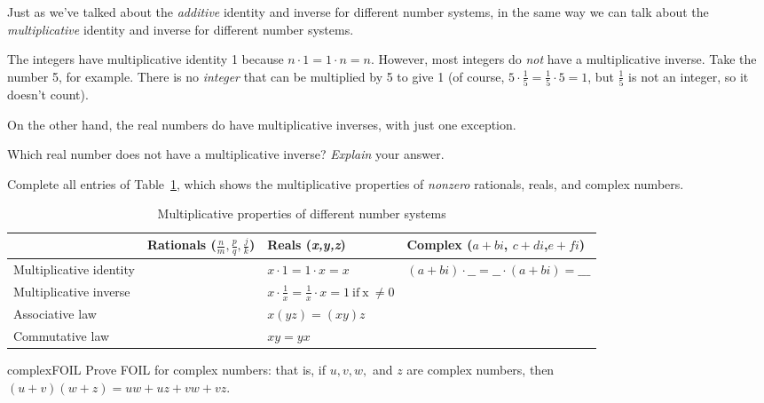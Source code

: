 Just as we've talked about the \emph{additive} identity and inverse
for different number systems, in the same way we can talk about the
\emph{multiplicative} identity and inverse for different number systems.

The integers have multiplicative identity 1 because $n\cdot1=1\cdot n=n$.
However, most integers do \emph{not} have a multiplicative inverse.
Take the number 5, for example. There is no \emph{integer} that can be multiplied by 5 to give 1 (of course, $5\cdot\frac{1}{5}=\frac{1}{5}\cdot5=1$,
but $\frac{1}{5}$ is not an integer, so it doesn't
count).

On the other hand, the real numbers do have multiplicative inverses,
with just one exception.

\begin{exercise}{14}
 Which real number does not
have a multiplicative inverse? \emph{Explain} your answer.
\end{exercise}

\begin{exercise}{15}
Complete all entries of Table~\ref{multiplicative_table}, which shows the multiplicative properties
of \emph{nonzero} rationals, reals, and complex numbers.

\begin{table}[!htb]
\caption{Multiplicative properties of different number systems}\label{multiplicative_table}
\begin{tabular}{|p{2.1cm}|p{2.9cm}|p{2.3 cm}|p{3.5cm}|}
\hline 
\rule{0pt}{2.6ex} & Rationals ($\frac{n}{m},\frac{p}{q},\frac{j}{k}$)  & Reals (\emph{x,y,z})  & Complex ($a+bi$, $c+di$,$e+fi$)\rule[-1.2ex]{0pt}{0pt}\tabularnewline
\hline
\hline 
\rule{0pt}{2.6ex} Multiplicative identity  &  & $x\cdot1=1\cdot x=x$  & $(a+bi)\cdot \_\_= \_\_\cdot(a+bi) = \_\_\_$ \rule[-1.2ex]{0pt}{0pt} \tabularnewline
\hline 
\rule{0pt}{2.6ex} Multiplicative inverse  &  & $x \cdot \frac{1}{x} = \frac{1}{x} \cdot x = 1 \mathrm{~if~x~\neq 0}$  & \rule[-1.2ex]{0pt}{0pt} \tabularnewline
\hline 
\rule{0pt}{2.6ex} Associative law  & & $x(yz) = (xy)z$  & \rule[-1.2ex]{0pt}{0pt} \tabularnewline
\hline 
\rule{0pt}{2.6ex} Commutative law  &  & $xy = yx$ & \rule[-1.2ex]{0pt}{0pt} \tabularnewline
\hline
\end{tabular}
\end{table}
\end{exercise}


\begin{exercise}{complexFOIL}
Prove FOIL for complex numbers: that is, if $u,v,w,$ and $z$ are complex numbers, then $(u+v)(w+z) = uw + uz+vw+vz$.
\end{exercise}

